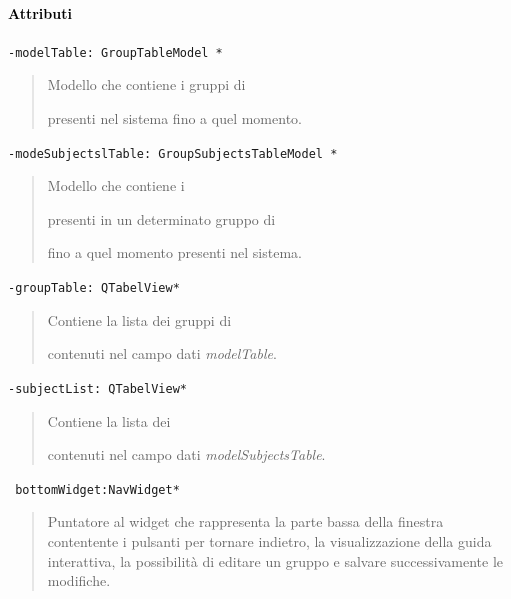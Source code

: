 \paragraph{\textcolor{black}{Attributi\\}}
\color{teal}\verb!-modelTable: GroupTableModel *!
\begin{quote}
\color{black}Modello che contiene i gruppi di\subject{} presenti nel sistema fino a quel momento.
\end{quote}
\color{teal}\verb!-modeSubjectslTable: GroupSubjectsTableModel *!
\begin{quote}
\color{black}Modello che contiene i \subject{} presenti in un determinato gruppo di \subject{} fino a quel momento presenti nel sistema.
\end{quote}
\color{teal}\verb!-groupTable: QTabelView*!
\color{black}
\begin{quote}
Contiene la lista dei gruppi di \subject{} contenuti nel campo dati \emph{modelTable}.
\end{quote}
\color{teal}\verb!-subjectList: QTabelView*!
\color{black}
\begin{quote}
Contiene la lista dei \subject{} contenuti nel campo dati \emph{modelSubjectsTable}.
\end{quote}
\color{teal}\verb! bottomWidget:NavWidget*!
\color{black} 
\begin{quote}
Puntatore al widget che rappresenta la parte bassa della finestra contentente i pulsanti per tornare indietro, la visualizzazione della guida interattiva, la possibilità di editare un gruppo e salvare successivamente le modifiche.
\end{quote}

